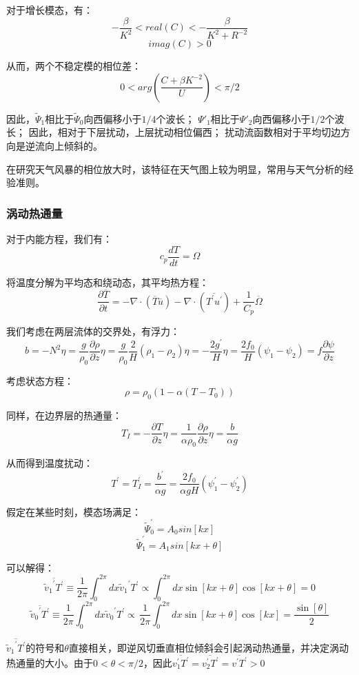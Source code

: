 \documentclass{article}
\begin{document}
对于增长模态，有：
$$-\frac{\beta}{K^2}<real(C)<-\frac{\beta}{K^2+R^{-2}}$$
$$imag(C)>0$$

从而，两个不稳定模的相位差：
$$0<arg(\frac{C +\beta K^{-2}}{U})<\pi/2$$

因此，$\tilde{\Psi}_1$相比于$\tilde{\Psi}_0$向西偏移小于$1/4$个波长；
$\Psi'_1$相比于$\Psi'_2$向西偏移小于$1/2$个波长；
因此，相对于下层扰动，上层扰动相位偏西；
扰动流函数相对于平均切边方向是逆流向上倾斜的。

在研究天气风暴的相位放大时，该特征在天气图上较为明显，常用与天气分析的经验准则。

\subsubsection{涡动热通量}
对于内能方程，我们有：
$$c_p\frac{dT}{dt}=\Omega$$

将温度分解为平均态和绕动态，其平均热方程：
$$\frac{\partial \overline{T}}{\partial t}=-\nabla \cdot (\overline{T}\overline{u})-\nabla \cdot (\overline{{T}^{\prime}{u}^{\prime}})+\frac{1}{{{C}_{p}}}\overline{\Omega }$$

我们考虑在两层流体的交界处，有浮力：
$$b = -N^2\eta = \frac{g}{\rho_0}\frac{\partial \rho}{\partial z}\eta = \frac{g}{\rho_0}\frac{2}{H}(\rho_1-\rho_2)\eta=-\frac{2g^{\prime}}{H}\eta =\frac{2f_0}{H}(\psi_1-\psi_2)=f\frac{\partial \psi}{\partial z} $$

考虑状态方程：
$$\rho = \rho_0(1-\alpha(T-T_0))$$

同样，在边界层的热通量：
$$T_I = -\frac{\partial T}{\partial z}\eta = \frac{1}{\alpha\rho_0}\frac{\partial \rho}{\partial z}\eta = \frac{b}{\alpha g }$$

从而得到温度扰动：
$$T^{\prime} = T_I^{\prime} = \frac{b^{\prime}}{\alpha g} = \frac{2f_0}{\alpha gH}(\psi_1^{\prime}-\psi_2^{\prime})$$

假定在某些时刻，模态场满足：
$$\tilde{\Psi}_0^{\prime} = A_0sin[kx]$$
$$\tilde{\Psi}_1^{\prime} = A_1sin[kx+\theta]$$

可以解得：
$$\overline{{{\widetilde{v}}_{1}}^{\prime }{T}^{\prime}}\equiv \frac{1}{2\pi }\int_{0}^{2\pi }{dx}{{\widetilde{v}}_{1}}^{\prime }{T}^{\prime}\propto \int_{0}^{2\pi }{dx}\sin [kx+\theta ]\cos [kx+\theta ]=0$$
$$\overline{{{\widetilde{v}}_{0}}^{\prime }{T}^{\prime}}\equiv \frac{1}{2\pi }\int_{0}^{2\pi }{dx}{{\widetilde{v}}_{0}}^{\prime }{T}^{\prime}\overset{}{\mathop{\propto }}\,\frac{1}{2\pi }\int_{0}^{2\pi }{dx}\sin [kx+\theta ]\cos [kx]=\frac{\sin [\theta ]}{2}$$

$\overline{{{\widetilde{v}}_{1}}^{\prime }{T}^{\prime}}$的符号和$\theta$直接相关，即逆风切垂直相位倾斜会引起涡动热通量，并决定涡动热通量的大小。由于$0<\theta<\pi/2$，因此$\overline{v_1^{\prime}T^{\prime}}=\overline{v_2^{\prime}T^{\prime}}=\overline{v^{\prime}T^{\prime}}>0$
\end{document}
